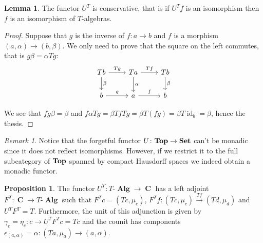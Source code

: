 \documentclass[a4paper,11pt,twoside, openany]{book}
\newcommand{\catname}[1]{{\normalfont\textbf{#1}}}
\DeclareMathOperator{\Alg}{\mathbf{Alg}}
\newcommand{\Set}{\catname{Set}}
\newcommand{\Top}{\catname{Top}}
\DeclareMathOperator{\C}{\mathbf{C}}
\DeclareMathOperator{\id}{id}
\theoremstyle{definition}
\theoremstyle{definition}
\newtheorem{prop}[thm]{Proposition}
\newtheorem{lemma}[thm]{Lemma}
\theoremstyle{remark}
\newtheorem{rmk}[thm]{Remark}
\begin{document}
	\begin{lemma}
		The functor $U^T$ is conservative, that is if $U^Tf$ is an isomorphism then $f$ is an isomorphism of $T$-algebras.
	\end{lemma}
	\begin{proof}
		Suppose that $g$ is the inverse of $f\colon a\rightarrow b$ and $f$ is a morphism $(a,\alpha)\rightarrow (b,\beta)$. We only need to prove that the square on the left commutes, that is $g\beta=\alpha Tg$:
		\[
			\begin{tikzcd}
				Tb\arrow["\beta"]{d}\arrow["Tg"]{r}
				& Ta\arrow["\alpha"]{d}\arrow["Tf"]{r}
				& Tb\arrow["\beta"]{d} \\
				b\arrow["g"]{r}
				& a\arrow["f"]{r}
				& b
			\end{tikzcd}
		\]
		
	We see that $fg\beta=\beta$ and $f\alpha Tg=\beta Tf Tg=\beta T(fg)=\beta T\id_b=\beta$, hence the thesis.
	\end{proof}
    \begin{rmk}
     Notice that the forgetful functor $U\colon\Top\to\Set$ can't be monadic since it does not reflect isomorphisms. However, if we restrict it to the full subcategory of $\Top$ spanned by compact Hausdorff spaces we indeed obtain a monadic functor.
    \end{rmk}
	\begin{prop}
		The functor $U^T\colon T\mbox{-}\Alg\rightarrow\C$ has a left adjoint $F^T\colon\C\rightarrow T\mbox{-}\Alg$ such that $F^Tc=(Tc,\mu_{c})$, $F^Tf\colon(Tc,\mu_{c})\xrightarrow{Tf} (Td,\mu_{d})$ and $U^TF^T=T$. Furthermore, the unit of this adjunction is given by $\gamma_c=\eta_c\colon c\to U^TF^Tc=Tc$ and the counit has components $\epsilon_{(a,\alpha)}=\alpha\colon(Ta,\mu_a)\to(a,\alpha)$.
	\end{prop}
\end{document}
